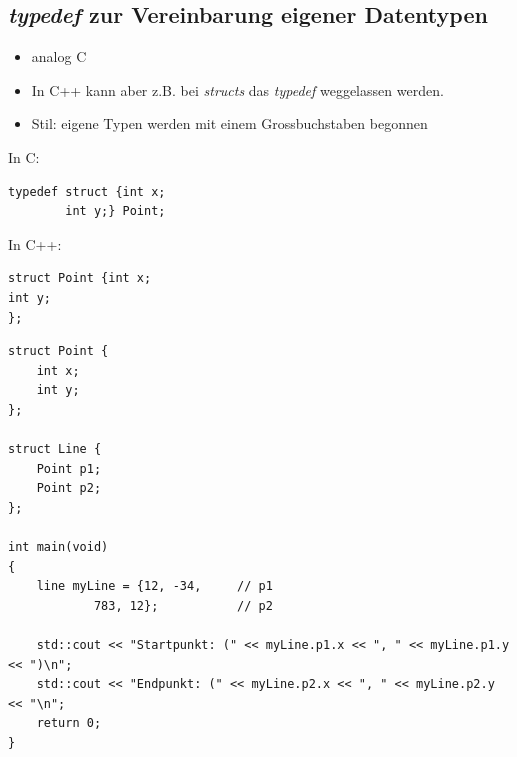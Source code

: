 \subsection{\emph{typedef} zur Vereinbarung eigener Datentypen\hfill}
\begin{minipage}[t]{0.6\linewidth}
\begin{itemize}
	\item analog C
	\item In C++ kann aber z.B. bei \emph{structs} das \emph{typedef} weggelassen werden.
	\item Stil: eigene Typen werden mit einem Grossbuchstaben begonnen
\end{itemize}
\end{minipage}
\hspace{0.05\linewidth}
\begin{minipage}[t]{0.3\linewidth}
\vspace{-3\baselineskip}
In C:
\vspace{-\baselineskip}
\begin{lstlisting}
typedef struct {int x;
		int y;} Point;
\end{lstlisting}
In C++:
\vspace{-\baselineskip}
\begin{lstlisting}
struct Point {int x;
int y;
};
\end{lstlisting}
\end{minipage}%
\vspace{-\baselineskip}
\begin{minipage}{\linewidth}
\begin{lstlisting}
struct Point {
	int x;
	int y;
};

struct Line {
	Point p1;
	Point p2;
};

int main(void)
{
	line myLine = {12, -34,		// p1
			783, 12};			// p2
		
	std::cout << "Startpunkt: (" << myLine.p1.x << ", " << myLine.p1.y << ")\n";
	std::cout << "Endpunkt: (" << myLine.p2.x << ", " << myLine.p2.y << "\n";
	return 0;
}
\end{lstlisting}
\end{minipage}

